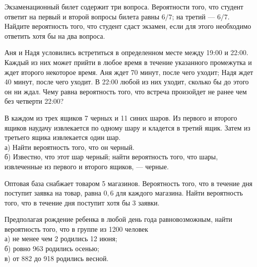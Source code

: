 \newpage\setcounter{zad}{0}



\begin{zkrW}{20}\noindent 
	Экзаменационный билет содержит три вопроса. Вероятности того, что студент ответит на первый и второй вопросы билета равны $6/7$; на третий --- $6/7$. Найдите вероятность того, что студент сдаст экзамен, если для этого необходимо ответить хотя бы на два вопроса.
 
\end{zkrW}

\begin{zkrW}{20}\noindent 
	Аня и Надя условились встретиться в определенном месте между 19:00 и 22:00. Каждый из них может прийти в любое время в течение указанного промежутка и ждет второго некоторое время. Аня ждет 70 минут, после чего уходит; Надя ждет 40 минут, после чего уходит. В 22:00 любой из них уходит, сколько бы до этого он ни ждал. Чему равна вероятность того, что встреча произойдет не ранее чем без четверти 22:00?
 
\end{zkrW}

\begin{zkrW}{20}\noindent 
	В каждом из трех ящиков 7 черных и 11 синих шаров. Из первого и второго ящиков наудачу извлекается по одному шару и кладется в третий ящик. Затем из третьего ящика извлекается один шар. \\ \indent а) Найти вероятность того, что он черный. \\ \indent б) Известно, что этот шар черный; найти вероятность того, что шары, извлеченные из первого и второго ящиков, --- черные.
 
\end{zkrW}

\begin{zkrW}{20}\noindent 
	Оптовая база снабжает товаром 5 магазинов. Вероятность того, что в течение дня поступит заявка на товар, равна $0{,}6$ для каждого магазина. Найти вероятность того, что в течение дня поступит хотя бы 3 заявки.
 
\end{zkrW}

\begin{zkrW}{20}\noindent 
	Предполагая рождение ребенка в любой день года равновозможным, найти вероятность того, что в группе из 1200 человек \\ \indent а) не менее чем 2 родились 12 июня; \\ \indent б) ровно 963 родились осенью; \\ \indent в) от 882 до 918 родились весной.
 
\end{zkrW}


